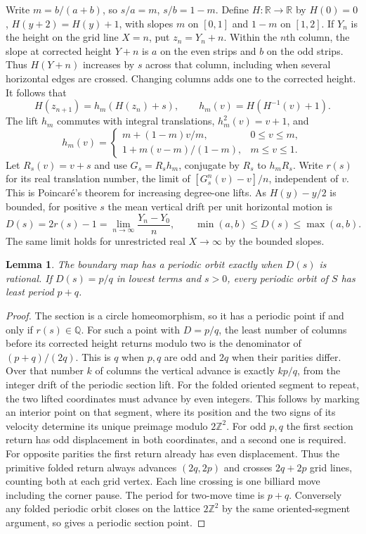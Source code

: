 \documentclass[11pt]{article}
\newtheorem{lemma}[theorem]{Lemma}
\newcommand{\R}{\mathbb R}
\newcommand{\Z}{\mathbb Z}
\begin{document}
Write $m=b/(a+b)$, so $s/a=m$, $s/b=1-m$. Define $H:\R\to\R$ by $H(0)=0$, $H(y+2)=H(y)+1$, with slopes $m$ on $[0,1]$ and $1-m$ on $[1,2]$. If $Y_n$ is the height on the grid line $X=n$, put $z_n=Y_n+n$. Within the $n$th column, the slope at corrected height $Y+n$ is $a$ on the even strips and $b$ on the odd strips. Thus $H(Y+n)$ increases by $s$ across that column, including when several horizontal edges are crossed. Changing columns adds one to the corrected height. It follows that
\[
 H(z_{n+1})=h_m(H(z_n)+s),\qquad h_m(v)=H(H^{-1}(v)+1).
\]
The lift $h_m$ commutes with integral translations, $h_m^2(v)=v+1$, and
\[
 h_m(v)=
 \begin{cases}
 m+(1-m)v/m,&0\le v\le m,\\
 1+m(v-m)/(1-m),&m\le v\le1 .
 \end{cases}
\]
Let $R_s(v)=v+s$ and use $G_s=R_s h_m$, conjugate by $R_s$ to $h_m R_s$. Write $r(s)$ for its real translation number, the limit of $[G_s^n(v)-v]/n$, independent of $v$. This is Poincar\'e's theorem for increasing degree-one lifts. As $H(y)-y/2$ is bounded, for positive $s$ the mean vertical drift per unit horizontal motion is
\begin{equation}\label{eq:drift}
 D(s)=2r(s)-1=\lim_{n\to\infty}\frac{Y_n-Y_0}{n},\qquad
 \min(a,b)\le D(s)\le\max(a,b).
\end{equation}
The same limit holds for unrestricted real $X\to\infty$ by the bounded slopes.

\begin{lemma}\label{kin}
The boundary map has a periodic orbit exactly when $D(s)$ is rational. If $D(s)=p/q$ in lowest terms and $s>0$, every periodic orbit of $S$ has least period $p+q$.
\end{lemma}
\begin{proof}
The section is a circle homeomorphism, so it has a periodic point if and only if $r(s)\in\mathbb Q$. For such a point with $D=p/q$, the least number of columns before its corrected height returns modulo two is the denominator of $(p+q)/(2q)$. This is $q$ when $p,q$ are odd and $2q$ when their parities differ. Over that number $k$ of columns the vertical advance is exactly $kp/q$, from the integer drift of the periodic section lift. For the folded oriented segment to repeat, the two lifted coordinates must advance by even integers. This follows by marking an interior point on that segment, where its position and the two signs of its velocity determine its unique preimage modulo $2\Z^2$. For odd $p,q$ the first section return has odd displacement in both coordinates, and a second one is required. For opposite parities the first return already has even displacement. Thus the primitive folded return always advances $(2q,2p)$ and crosses $2q+2p$ grid lines, counting both at each grid vertex. Each line crossing is one billiard move including the corner pause. The period for two-move time is $p+q$. Conversely any folded periodic orbit closes on the lattice $2\Z^2$ by the same oriented-segment argument, so gives a periodic section point.
\end{proof}
\end{document}

